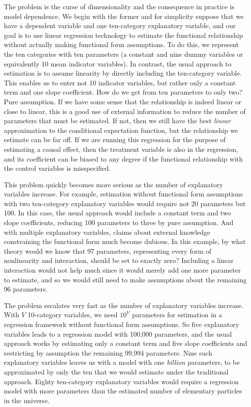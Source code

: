\documentclass[11pt,titlepage]{article}
\begin{document}
The problem is the curse of dimensionality and the consequence in
practice is model dependence.  We begin with the former and for
simplicity suppose that we have a dependent variable and one
ten-category explanatory variable, and our goal is to use linear
regression technology to estimate the functional relationship without
actually making functional form assumptions.  To do this, we represent
the ten categories with ten parameters (a constant and nine dummy
variables or equivalently 10 mean indicator variables).  In contrast,
the usual approach to estimation is to assume linearity by directly
including the ten-category variable.  This enables us to enter not 10
indicator variables, but rather only a constant term and one slope
coefficient.  How do we get from ten parameters to only two?  Pure
assumption.  If we have some sense that the relationship is indeed
linear or close to linear, this is a good use of external information
to reduce the number of parameters that must be estimated.  If not,
then we still have the best {\it linear} approximation to the
conditional expectation function, but the relationship we estimate can
be far off.  If we are running this regression for the purpose of
estimating a causal effect, then the treatment variable is also in the
regression, and its coefficient can be biased to any degree if the
functional relationship with the control variables is misspecified.

This problem quickly becomes more serious as the number of explanatory
variables increase.  For example, estimation without functional form
assumptions with two ten-category explanatory variables would require
not 20 parameters but 100.  In this case, the usual approach would
include a constant term and two slope coefficients, reducing 100
parameters to three by pure assumption.  And with multiple explanatory
variables, claims about external knowledge constraining the functional
form much become dubious.  In this example, by what theory would we
know that 97 parameters, representing every form of nonlinearity and
interaction, should be set to exactly zero?  Including a linear
interaction would not help much since it would merely add one more
parameter to estimate, and so we would still need to make assumptions
about the remaining 96 parameters.

The problem escalates very fast as the number of explanatory variables
increase.  With $V$ 10-category variables, we need $10^V$ parameters
for estimation in a regression framework without functional form
assumptions.  So five explanatory variables leads to a regression
model with 100,000 parameters, and the usual approach works by
estimating only a constant term and five slope coefficients and
restricting by assumption the remaining 99,994 parameters.  Nine such
explanatory variables leaves us with a model with one \emph{billion}
parameters, to be approximated by only the ten that we would estimate
under the traditional approach.  Eighty ten-category explanatory
variables would require a regression model with more parameters than
the estimated number of elementary particles in the universe.
\end{document}
